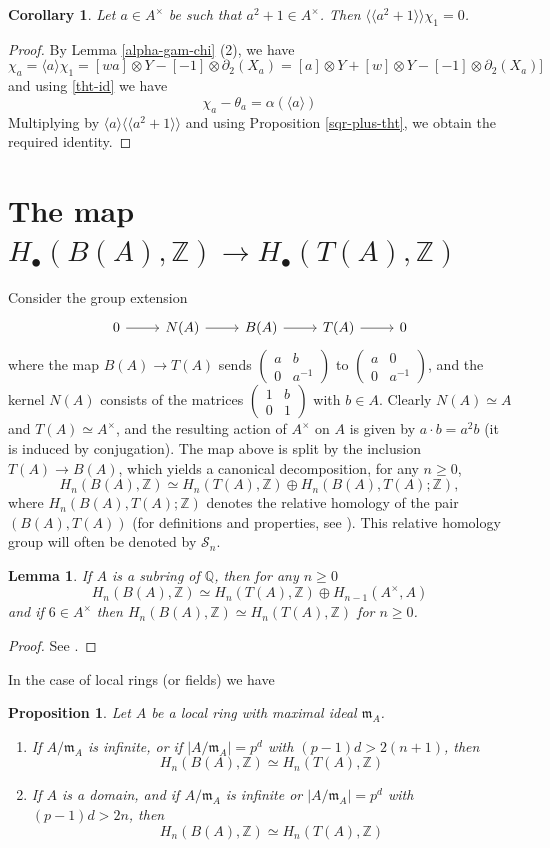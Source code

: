 \documentclass[11pt]{amsart}
\theoremstyle{definition}
\theoremstyle{plain}
\newtheorem{lem}[ntn]{Lemma}
\newtheorem{prp}[ntn]{Proposition}
\newtheorem{cor}[ntn]{Corollary}
\theoremstyle{definition}
\numberwithin{equation}{section}
\newcommand{\z}{\mathbb{Z}}
\newcommand{\q}{\mathbb{Q}}
\renewcommand{\SS}{\mathcal{S}}
\newcommand{\mmm}{\mathfrak{m}}
\renewcommand{\aa}{{A^\times}}
\newcommand{\lan}{\langle}
\newcommand{\ran}{\rangle}
\newcommand{\Lan}{\langle \! \langle}
\newcommand{\Ran}{\rangle \! \rangle}
\newcommand{\mtxx}[4]
{\left(\!\!
	\begin{array}{cc}
		\!\!#1 & \!\!#2\\
		\!\!#3 & \!\!#4
	\end{array}\!\!
	\right)}
\begin{document}
	\begin{cor}
		\label{sqr-plus-chi}
		Let $a\in\aa$ be such that $a^2+1\in\aa$. Then $\Lan a^2+1\Ran\chi_1=0$.
	\end{cor}
	\begin{proof}
		By Lemma \ref{alpha-gam-chi} (2), we have
		\[
		\chi_a=\lan a\ran\chi_1=[wa]\otimes Y-[-1]\otimes\partial_2(X_a)=[a]\otimes Y+[w]\otimes Y-[-1]\otimes\partial_2(X_a)]
		\]
		and using \eqref{tht-id} we have
		\[
		\chi_a-\theta_a=\alpha(\lan a\ran)
		\]
		Multiplying by $\lan a\ran\Lan a^2+1\Ran$ and using Proposition \ref{sqr-plus-tht}, we obtain the required identity.
	\end{proof}
	\section{The map \texorpdfstring{$H_\bullet(B(A),\z)\to H_\bullet(T(A),\z)$}{H.(B)->H.(T)}}\label{sec-hb-ht}
	Consider the group extension
	\[
	\begin{tikzcd}
		0\ar[r] & N(A)\ar[r] & B(A) \ar[r] & T(A)\ar[r] & 0
	\end{tikzcd}
	\]
	where the map $B(A)\to T(A)$ sends $\mtxx{a}{b}{0}{a^{-1}}$ to $\mtxx{a}{0}{0}{a^{-1}}$, and the kernel $N(A)$ consists of the matrices $\mtxx{1}{b}{0}{1}$ with $b\in A$. Clearly $N(A)\simeq A$ and $T(A)\simeq\aa$, and the resulting action of $\aa$ on $A$ is given by $a\cdot b=a^2b$ (it is induced by conjugation).
	The map above is split by the inclusion $T(A)\to B(A)$, which yields a canonical decomposition, for any $n\geq 0$,
	\[
	H_n(B(A),\z)\simeq H_n(T(A),\z)\oplus H_n(B(A),T(A);\z),
	\]
	where $H_n(B(A),T(A);\z)$ denotes the relative homology of the pair $(B(A),T(A))$ (for definitions and properties, see \cite[page 153]{knudson2001}). This relative homology group will often be denoted by $\SS_n$.
	\begin{lem}
		\label{ht-hb-l1}
		If $A$ is a subring of $\q$, then for any $n\geq 0$
		\[ 
		H_n(B(A),\z)\simeq H_n(T(A),\z)\oplus H_{n-1}(\aa,A)
		\]
		and if $6\in\aa$ then $H_n(B(A),\z)\simeq H_n(T(A),\z)$ for $n\geq 0$.
	\end{lem}
	\begin{proof}
		See \cite[Lemma 3.5]{B-E--2023}.
	\end{proof}
	In the case of local rings (or fields) we have
	\begin{prp}\label{ht-hb-local}
		Let $A$ be a local ring with maximal ideal $\mmm_A$.
		\begin{enumerate}
			\item If $A/\mmm_A$ is infinite, or if $|A/\mmm_A|=p^d$ with $(p-1)d>2(n+1)$, then
			\[
			H_n(B(A),\z)\simeq H_n(T(A),\z)
			\]
			\item If $A$ is a domain, and if $A/\mmm_A$ is infinite or $|A/\mmm_A|=p^d$ with $(p-1)d>2n$, then
			\[
			H_n(B(A),\z)\simeq H_n(T(A),\z)
			\] 
		\end{enumerate}
	\end{prp}
\end{document}
